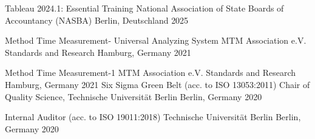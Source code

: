 



\begin{cvhonors}


  \cvhonor
    {Tableau 2024.1: Essential Training} %
    {National Association of State Boards of Accountancy (NASBA)} %
    {Berlin, Deutschland} %
    {2025} %

  \cvhonor
    {Method Time Measurement- Universal Analyzing System} %
    {MTM Association e.V. Standards and Research} %
    {Hamburg, Germany} %
    {2021} %

  \cvhonor
    {Method Time Measurement-1} %
    {MTM Association e.V. Standards and Research} %
    {Hamburg, Germany} %
    {2021} %
  \cvhonor
    {Six Sigma Green Belt (acc. to ISO 13053:2011)} %
    {Chair of Quality Science, Technische Universität Berlin} %
    {Berlin, Germany} %
    {2020} %

  \cvhonor
    {Internal Auditor (acc. to ISO 19011:2018)} %
    {Technische Universität Berlin} %
    {Berlin, Germany} %
    {2020} %

\end{cvhonors}




